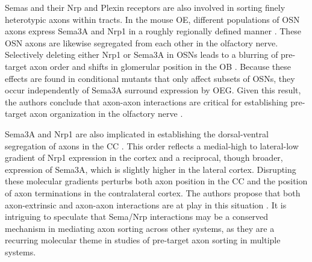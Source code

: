 Semas and their Nrp and Plexin receptors are also involved in sorting finely heterotypic axons within tracts.
In the mouse OE, different populations of OSN axons express Sema3A and Nrp1 in a roughly regionally defined manner \cite{imai2009pre}.
These OSN axons are likewise segregated from each other in the olfactory nerve.
Selectively deleting either Nrp1 or Sema3A in OSNs leads to a blurring of pre-target axon order and shifts in glomerular position in the OB \cite{imai2009pre}.
Because these effects are found in conditional mutants that only affect subsets of OSNs, they occur independently of Sema3A surround expression by OEG.
Given this result, the authors conclude that axon-axon interactions are critical for establishing pre-target axon organization in the olfactory nerve \cite{imai2009pre}.

Sema3A and Nrp1 are also implicated in establishing the dorsal-ventral segregation of axons in the CC \cite{zhou2013axon}.
This order reflects a medial-high to lateral-low gradient of Nrp1 expression in the cortex and a reciprocal, though broader, expression of Sema3A, which is slightly higher in the lateral cortex.
Disrupting these molecular gradients perturbs both axon position in the CC and the position of axon terminations in the contralateral cortex.
The authors propose that both axon-extrinsic and axon-axon interactions are at play in this situation \cite{zhou2013axon}.
It is intriguing to speculate that Sema/Nrp interactions may be a conserved mechanism in mediating axon sorting across other systems, as they are a recurring molecular theme in studies of pre-target axon sorting in multiple systems.